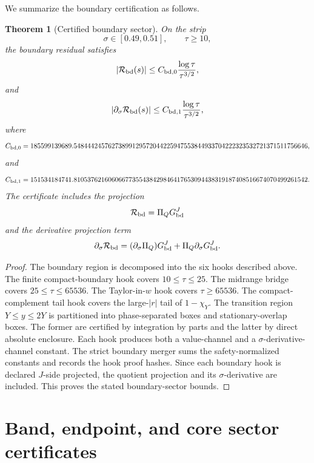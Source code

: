 \documentclass[11pt]{article}
\newtheorem{theorem}{Theorem}[section]
\newcommand{\s}{s}
\newcommand{\sig}{\sigma}
\newcommand{\tauh}{\tau}
\newcommand{\Rbd}{\mathcal R_{\rm bd}}
\newcommand{\Gbd}{G_{\rm bd}^{J}}
\newcommand{\PiQ}{\Pi_Q}
\begin{document}
We summarize the boundary certification as follows.

\begin{theorem}[Certified boundary sector]
On the strip
\[
        \sig\in[0.49,0.51],
        \qquad
        \tauh\ge10,
\]
the boundary residual satisfies
\[
        |\Rbd(\s)|
        \le
        C_{{\rm bd},0}
        \frac{\log\tauh}{\tauh^{3/2}},
\]
and
\[
        |\partial_\sig\Rbd(\s)|
        \le
        C_{{\rm bd},1}
        \frac{\log\tauh}{\tauh^{3/2}},
\]
where
\[
        C_{{\rm bd},0}
        =
        185599139689.54844424576273899129572044225947553844933704222323532721371511756646,
\]
and
\[
        C_{{\rm bd},1}
        =
        151534184741.81053762160606677355438429846417653094438319187408516674070499261542.
\]
The certificate includes the projection
\[
        \Rbd=\PiQ\Gbd
\]
and the derivative projection term
\[
        \partial_\sig\Rbd
        =
        (\partial_\sig\PiQ)\Gbd+\PiQ\partial_\sig\Gbd.
\]
\end{theorem}

\begin{proof}
The boundary region is decomposed into the six hooks described above.  The
finite compact-boundary hook covers \(10\le\tauh\le25\).  The midrange bridge
covers \(25\le\tauh\le65536\).  The Taylor-in-\(w\) hook covers
\(\tauh\ge65536\).  The compact-complement tail hook covers the large-\(|r|\)
tail of \(1-\chi_Y\).  The transition region \(Y\le y\le2Y\) is partitioned
into phase-separated boxes and stationary-overlap boxes.  The former are
certified by integration by parts and the latter by direct absolute enclosure.
Each hook produces both a value-channel and a \(\sig\)-derivative-channel
constant.  The strict boundary merger sums the safety-normalized constants and
records the hook proof hashes.  Since each boundary hook is declared
\(J\)-side projected, the quotient projection and its \(\sig\)-derivative are
included.  This proves the stated boundary-sector bounds.
\end{proof}




\section{Band, endpoint, and core sector certificates}
\end{document}
